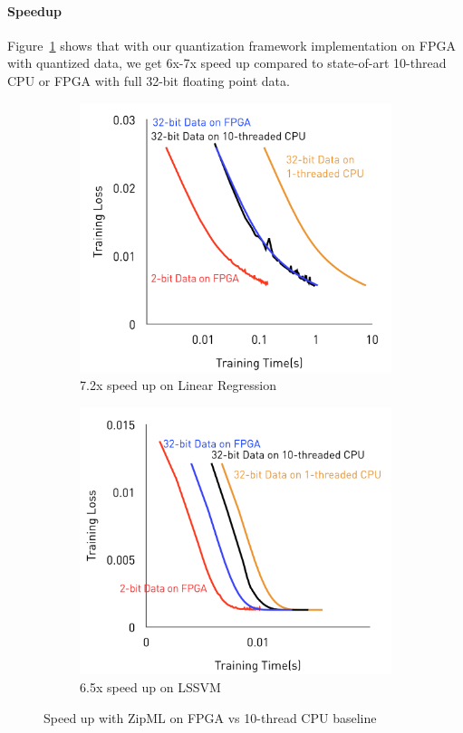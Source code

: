 \documentclass{article}
\begin{document}
\paragraph{Speedup}
Figure~\ref{fig:speedup} shows that with our quantization framework
implementation on FPGA with quantized data, 
we get 6x-7x speed up compared to state-of-art
10-thread CPU or FPGA with full 32-bit floating point data.
\begin{figure}[h]
\centering
    \begin{subfigure}[h]{.4\columnwidth}
    \includegraphics[width=\columnwidth]{final-experiments/SpeedUp-LR} 
    \caption{7.2x speed up on Linear Regression}
    \end{subfigure}
    \begin{subfigure}[h]{.4\columnwidth}
    \includegraphics[width=\columnwidth]{final-experiments/SpeedUp-LSSVM} 
    \caption{6.5x speed up on LSSVM}
    \end{subfigure}
\caption{Speed up with ZipML on FPGA vs 10-thread CPU baseline}
\label{fig:speedup}
\end{figure}
\end{document}
